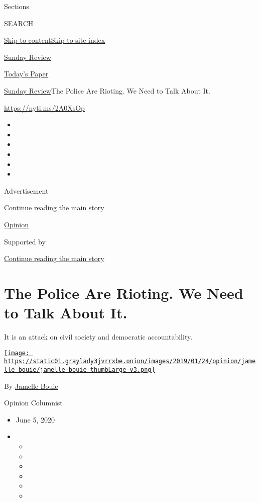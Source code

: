 Sections

SEARCH

\protect\hyperlink{site-content}{Skip to
content}\protect\hyperlink{site-index}{Skip to site index}

\href{https://www.nytimes3xbfgragh.onion/section/opinion/sunday}{Sunday
Review}

\href{https://myaccount.nytimes3xbfgragh.onion/auth/login?response_type=cookie\&client_id=vi}{}

\href{https://www.nytimes3xbfgragh.onion/section/todayspaper}{Today's
Paper}

\href{/section/opinion/sunday}{Sunday Review}\textbar{}The Police Are
Rioting. We Need to Talk About It.

\url{https://nyti.ms/2A0XsOp}

\begin{itemize}
\item
\item
\item
\item
\item
\item
\end{itemize}

Advertisement

\protect\hyperlink{after-top}{Continue reading the main story}

\href{/section/opinion}{Opinion}

Supported by

\protect\hyperlink{after-sponsor}{Continue reading the main story}

\hypertarget{the-police-are-rioting-we-need-to-talk-about-it}{%
\section{The Police Are Rioting. We Need to Talk About
It.}\label{the-police-are-rioting-we-need-to-talk-about-it}}

It is an attack on civil society and democratic accountability.

\href{https://www.nytimes3xbfgragh.onion/column/jamelle-bouie}{\texttt{[image: https://static01.graylady3jvrrxbe.onion/images/2019/01/24/opinion/jamelle-bouie/jamelle-bouie-thumbLarge-v3.png]}}

By
\href{https://www.nytimes3xbfgragh.onion/column/jamelle-bouie}{Jamelle
Bouie}

Opinion Columnist

\begin{itemize}
\item
  June 5, 2020
\item
  \begin{itemize}
  \item
  \item
  \item
  \item
  \item
  \item
  \end{itemize}
\end{itemize}

